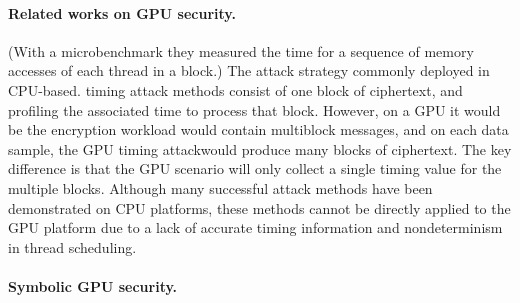 \paragraph{Related works on GPU security.}
(With a microbenchmark they measured the
time for a sequence of memory accesses of each thread in a block.)
%
The attack strategy commonly deployed in CPU-based. timing attack methods consist of one block of ciphertext, and profiling the associated time to process that
block. However, on a GPU it would be the encryption workload would contain multiblock messages, and on each data sample, the GPU
timing attackwould produce many blocks of ciphertext.
The key difference is that the GPU scenario will only
collect a single timing value for the multiple blocks.
Although many successful attack methods have been
demonstrated on CPU platforms, these methods cannot be directly applied to the GPU platform due to a
lack of accurate timing information and nondeterminism in thread scheduling.

\paragraph{Symbolic GPU security.}


